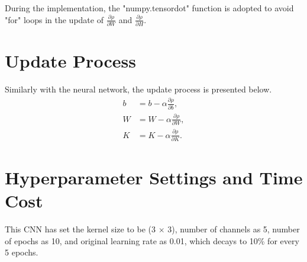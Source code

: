 \documentclass[12pt]{article}
\begin{document}
During the implementation, the "numpy.tensordot" function is adopted to avoid "for" loops in the update of $\frac{\partial \rho}{\partial W}$ and $\frac{\partial \rho}{\partial H}$.

\section{Update Process}
Similarly with the neural network, the update process is presented below.
\begin{equation}
\begin{aligned}
b &= b - \alpha \frac{\partial \rho}{\partial b},\\
W &= W - \alpha \frac{\partial \rho}{\partial W},\\
K &= K - \alpha \frac{\partial \rho}{\partial K}.
\end{aligned}
\end{equation}

\section{Hyperparameter Settings and Time Cost}
This CNN has set the kernel size to be (3 $\times$ 3), number of channels as 5, number of epochs as 10, and original learning rate as 0.01, which decays to 10\% for every 5 epochs.\\
\end{document}
